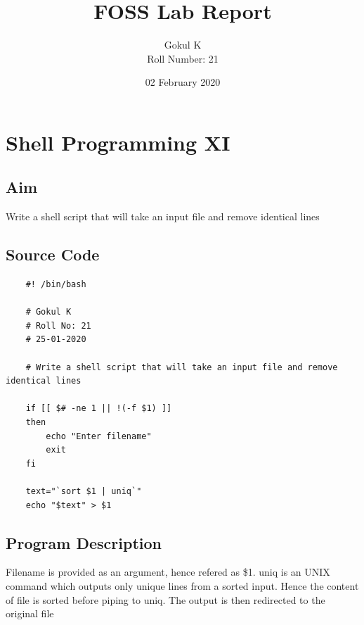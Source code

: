 \documentclass{article}
\begin{document}
\title{FOSS Lab Report}
\author{Gokul K\\[2\baselineskip]
Roll Number: 21\\[2\baselineskip]}
\date{02 February 2020}

\maketitle

\setcounter{section}{14}
\section{Shell Programming XI}
\subsection{Aim}
Write a shell script that will take an input file and remove identical lines


\subsection{Source Code}
\begin{verbatim}
    #! /bin/bash

    # Gokul K
    # Roll No: 21
    # 25-01-2020

    # Write a shell script that will take an input file and remove identical lines

    if [[ $# -ne 1 || !(-f $1) ]]
    then
        echo "Enter filename"
        exit
    fi

    text="`sort $1 | uniq`"
    echo "$text" > $1

\end{verbatim}

\subsection{Program Description}
Filename is provided as an argument, hence refered as \$1. uniq is an UNIX command
which outputs only unique lines from a sorted input. Hence the content of file is
sorted before piping to uniq. The output is then redirected to the original file
\end{document}
